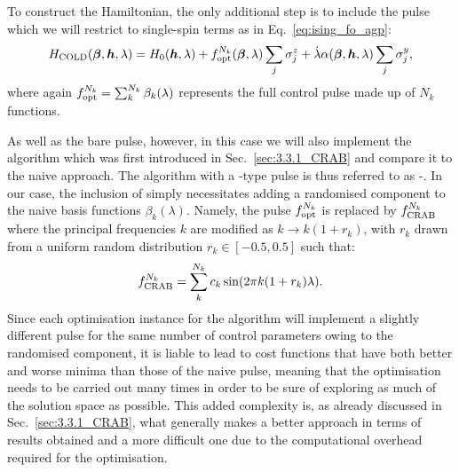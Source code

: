 To construct the  Hamiltonian, the only additional step is to include the  pulse which we will restrict to single-spin terms as in Eq.~\eqref{eq:ising_fo_agp}:
\begin{equation}
    H_{\rm COLD}(\boldsymbol{\beta}, \boldsymbol{h}, \lambda) = H_0(\boldsymbol{h}, \lambda) + f_{\rm opt}^{N_k}(\boldsymbol{\beta}, \lambda)\sum_j \sigma^z_j + \dot{\lambda} \alpha(\boldsymbol{\beta}, \boldsymbol{h}, \lambda)\sum_j \sigma^y_j,
\end{equation}
where again $f_{\rm opt}^{N_k} = \sum_k^{N_k} \beta_k(\lambda)$ represents the full control pulse made up of $N_k$ functions. 

As well as the bare pulse, however, in this case we will also implement the  algorithm which was first introduced in Sec.~\ref{sec:3.3.1_CRAB} and compare it to the naive approach. The  algorithm with a -type pulse is thus referred to as -. In our case, the inclusion of  simply necessitates adding a randomised component to the naive basis functions $\beta_k(\lambda)$. Namely, the pulse $f_{\rm opt}^{N_k}$ is replaced by $f_{\rm CRAB}^{N_k}$ where the principal frequencies $k$ are modified as $k \rightarrow k(1+r_k)$, with $r_k$ drawn from a uniform random distribution $r_k \in [-0.5,0.5]$ such that:
\begin{equation}\label{eq:ising_crab_pulse}
    f_{\rm CRAB}^{N_k} = \sum_k^{N_k} c_k \sin(2 \pi k(1+r_k)\lambda).
\end{equation}
Since each optimisation instance for the  algorithm will implement a slightly different pulse for the same number of control parameters owing to the randomised component, it is liable to lead to cost functions that have both better and worse minima than those of the naive pulse, meaning that the optimisation needs to be carried out many times in order to be sure of exploring as much of the solution space as possible. This added complexity is, as already discussed in Sec.~\ref{sec:3.3.1_CRAB}, what generally makes  a better approach in terms of results obtained and a more difficult one due to the computational overhead required for the optimisation.  

